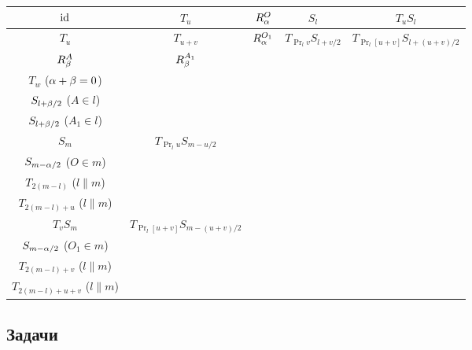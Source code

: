 \renewcommand{\arraystretch}{1.8}\renewcommand{\tabcolsep}{1mm}
\begin{center}\small
\begin{tabular}{c|c|c|c|c|}
$\mathrm{id}$  &  $T_u$      &   $R_\alpha^O$   &   $S_l$   & $T_uS_l$  \\
\hline
$T_u$  &  $T_{u+v}$  &   $R_\alpha^{O_1}$ & $T_{\Pr_lv}S_{l+v/2}$ & $T_{\Pr_l[u+v]}S_{l+(u+v)/2}$ \\ \hline 
$R_\beta^A$ & $R_\beta^{A_1}$ & \specialcell{$R_{\al+\be}^C$ ($\al+\be\ne 0$) \\ $T_w$ ($\alpha+\beta=0$)} & \specialcell{$T_wS_{l+\be/2}$ ($A\notin l$) \\ $S_{l+\beta/2}$ ($A\in l$)} & \specialcell{$T_wS_{l+\be/2}$ ($A_1\notin l$) \\ $S_{l+\beta/2}$ ($A_1\in l$)} \\ \hline 
$S_m$ & $T_{\Pr_lu}S_{m-u/2} $ & \specialcell{$T_wS_{m-\al/2}$ ($O\notin m$) \\ $S_{m-\alpha/2}$ ($O\in m$)} &
\specialcell{$R_{2\angle lm}^{l\cap m}$ ($l\not\parallel m$) \\ $T_{2(m-l)}$ ($l\parallel m$)} & 
\specialcell{$R_{2\angle lm}^O$ ($l\not\parallel m$) \\ $T_{2(m-l)+u}$ ($l\parallel m$)} \\ \hline 
$T_vS_m$ & $T_{\Pr_l[u+v]}S_{m-(u+v)/2}$ & \specialcell{$T_wS_{m-\al/2}$ ($O_1\notin m$) \\ $S_{m-\alpha/2}$ ($O_1\in m$)} &
\specialcell{$R_{2\angle lm}^O$ ($l\not\parallel m$) \\ $T_{2(m-l)+v}$ ($l\parallel m$)} &
\specialcell{$R_{2\angle lm}^O$ ($l\not\parallel m$) \\ $T_{2(m-l)+u+v}$ ($l\parallel m$)} \\ \hline
\end{tabular}
\end{center}


\subsection*{Задачи}


